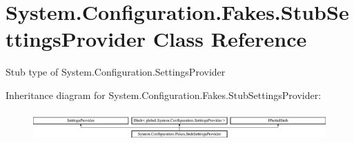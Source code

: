 \hypertarget{class_system_1_1_configuration_1_1_fakes_1_1_stub_settings_provider}{\section{System.\-Configuration.\-Fakes.\-Stub\-Settings\-Provider Class Reference}
\label{class_system_1_1_configuration_1_1_fakes_1_1_stub_settings_provider}
}


Stub type of System.\-Configuration.\-Settings\-Provider 


Inheritance diagram for System.\-Configuration.\-Fakes.\-Stub\-Settings\-Provider\-:\begin{figure}[H]
\begin{center}
\leavevmode
\includegraphics[height=1.141692cm]{class_system_1_1_configuration_1_1_fakes_1_1_stub_settings_provider}
\end{center}
\end{figure}
